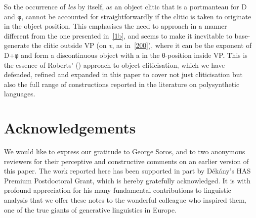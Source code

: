 \documentclass[output=paper]{langsci/langscibook}
\begin{document}
\begin{refcontext}
So the occurrence of \emph{les} by itself, as an object clitic that is a
portmanteau for D and φ{}, cannot be accounted for straightforwardly if
the clitic is taken to originate in the object position. This emphasises the
need to approach  in a manner different from the one presented
in~\eqref{1b}, and seems to make it inevitable to base-generate the clitic
outside VP (on \emph{v}, as in~\eqref{200}), where it can be the exponent of
D+φ{} and form a discontinuous object with a  in the
θ{}-position inside VP\@. This is the essence of Roberts'
(\citeyear{Roberts2010}) approach to object cliticisation, which we have
defended, refined and expanded in this paper to cover not just cliticisation
but also the full range of  constructions reported in the
literature on polysynthetic languages.

\printchapterglossary{}

\section*{Acknowledgements}
We would like to express our gratitude to George Soros, and to two anonymous
reviewers for their perceptive and constructive comments on an earlier version
of this paper. The work reported here has been  supported in part by Dékány's
HAS Premium Postdoctoral Grant, which is hereby gratefully acknowledged. It is
with profound appreciation for his many fundamental contributions to linguistic
analysis that we offer these notes to the wonderful colleague who inspired
them, one of the true giants of generative linguistics in Europe.
%

\printbibliography[heading=subbibliography,notkeyword=this]

\end{refcontext}
\end{document}
